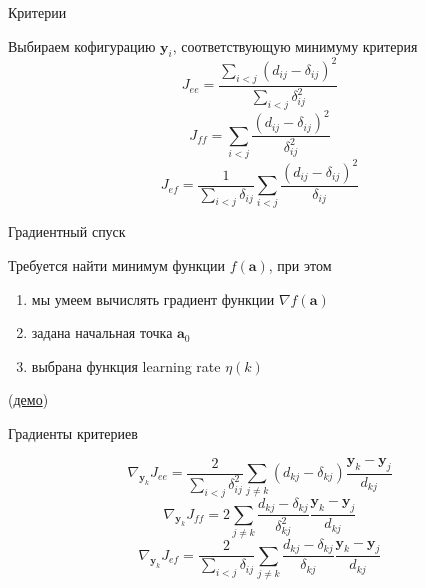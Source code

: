 \documentclass[10pt]{beamer}
\begin{document}
\begin{frame}{Критерии}

Выбираем кофигурацию $\mathbf{y}_i$, соответствующую минимуму критерия
\[
J_{ee} = \frac{\sum_{i < j} (d_{ij} - \delta_{ij})^2} {\sum_{i < j} \delta_{ij}^2}
\]
\[
J_{ff} = \sum_{i < j} \frac{(d_{ij} - \delta_{ij})^2}{\delta_{ij}^2}
\]
\[
J_{ef} = \frac{1} {\sum_{i < j} \delta_{ij}}\sum_{i < j} \frac{(d_{ij} - \delta_{ij})^2}{\delta_{ij}}
\]

\end{frame}


\begin{frame}{Градиентный спуск}

Требуется найти минимум функции $f(\mathbf{a})$, при этом
\begin{enumerate}
\item мы умеем вычислять градиент функции $\nabla f(\mathbf{a})$
\item задана начальная точка $\mathbf{a}_0$
\item выбрана функция learning rate $\eta(k)$
\end{enumerate}

\gd

(\href{http://vis.supstat.com/2013/03/gradient-descent-algorithm-with-r/}{демо})

\end{frame}

\begin{frame}{Градиенты критериев}

\[
\nabla_{\mathbf{y}_k}J_{ee} = \frac{2} {\sum_{i < j} \delta_{ij}^2} \sum_{j \neq k} (d_{kj} - \delta_{kj}) \frac{\mathbf{y}_k - \mathbf{y}_j}{d_{kj}}
\]
\[
\nabla_{\mathbf{y}_k} J_{ff} = 2 \sum_{j \neq k} \frac{d_{kj} - \delta_{kj}}{\delta_{kj}^2} \frac{\mathbf{y}_k - \mathbf{y}_j}{d_{kj}}
\]
\[
\nabla_{\mathbf{y}_k} J_{ef} = \frac{2} {\sum_{i < j} \delta_{ij}} \sum_{j \neq k} \frac{d_{kj} - \delta_{kj}}{\delta_{kj}} \frac{\mathbf{y}_k - \mathbf{y}_j}{d_{kj}}
\]

\end{frame}
\end{document}
